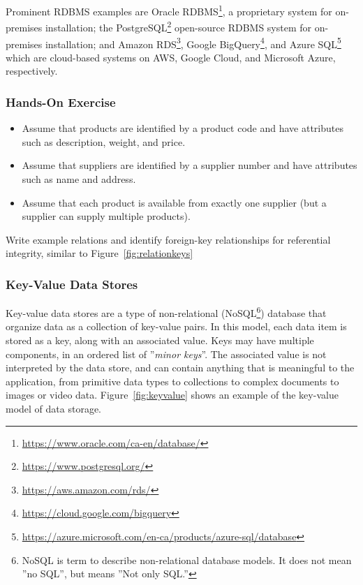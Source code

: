 Prominent RDBMS examples are Oracle RDBMS\footnote{\url{https://www.oracle.com/ca-en/database/}}, a proprietary system for on-premises installation; the PostgreSQL\footnote{\url{https://www.postgresql.org/}} open-source RDBMS system for on-premises installation; and Amazon RDS\footnote{\url{https://aws.amazon.com/rds/}}, Google BigQuery\footnote{\url{https://cloud.google.com/bigquery}}, and Azure SQL\footnote{\url{https://azure.microsoft.com/en-ca/products/azure-sql/database}} which are cloud-based systems on AWS, Google Cloud, and Microsoft Azure, respectively.

\begin{tcolorbox}[colback=code]
\subsubsection*{Hands-On Exercise} 

\begin{itemize}
	\item Assume that products are identified by a product code and have attributes such as description, weight, and price. 
	\item Assume that suppliers are identified by a supplier number and have attributes such as name and address.
	\item Assume that each product is available from exactly one supplier (but a supplier can supply multiple products).
\end{itemize}

\vspace{.5\baselineskip}
Write example relations and identify foreign-key relationships for referential integrity, similar to Figure~\ref{fig:relationkeys}
\end{tcolorbox}


\subsubsection*{Key-Value Data Stores}

Key-value data stores are a type of non-relational (NoSQL\footnote{NoSQL is term to describe non-relational database models. It does not mean ''no SQL'', but means ''Not only SQL.''}) database that organize data as a collection of key-value pairs. In this model, each data item is stored as a key, along with an associated value. Keys may have multiple components, in an ordered list of ''\emph{minor keys}''. The associated value is not interpreted by the data store, and can contain anything that is meaningful to the application, from primitive data types to collections to complex documents to images or video data. Figure~\ref{fig:keyvalue} shows an example of the key-value model of data storage.

